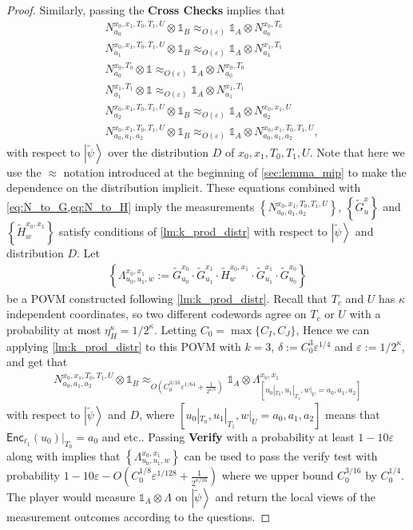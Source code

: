 \documentclass[10pt,a4paper]{article}
\theoremstyle{plain}
\theoremstyle{definition}
\newcommand {\set} [1] {\ensuremath{ \left\lbrace #1 \right\rbrace }}
\newcommand {\ket} [1] {\ensuremath{ \left| #1 \right\rangle }}
\newcommand {\id} {\ensuremath{\mathds{1}}}
\newcommand{\ep} {\ensuremath{\varepsilon}}
\newcommand{\x}{\otimes}
\newcommand{\appd}[1]{\approx_{#1}}
\newcommand{\1}{\mathbb{1}} %
\newcommand{\tG}{\tilde{G}}
\newcommand{\tH}{\tilde{H}}
\newcommand{\tpsi}{\tilde{\psi}}
\newcommand{\Enc}{\mathsf{Enc}}
\begin{document}
\begin{proof}
Similarly, passing the \textbf{Cross Checks} implies that
\begin{align}
	&N^{x_0, x_1, T_0, T_1, U}_{a_0} \x \id_B \appd{O(\ep)} \id_A \x N^{x_0, T_0}_{a_0} \\
	&N^{x_0, x_1, T_0, T_1, U}_{a_1} \x \id_B \appd{O(\ep)} \id_A \x N^{x_1, T_1}_{a_1} \\
	\label{eq:Nx0_consist}
	&N^{x_0, T_0}_{a_0} \x \id \appd{O(\ep)} \id_A \x N^{x_0, T_0}_{a_0} \\
	\label{eq:Nx1_consist}
	&N^{x_1, T_1}_{a_1} \x \id \appd{O(\ep)} \id_A \x N^{x_1, T_1}_{a_1} \\
	&N^{x_0, x_1, T_0, T_1, U}_{a_2} \x \id_B \appd{O(\ep)} \id_A \x N^{x_0, x_1, U}_{a_2} \\  
	&N^{x_0, x_1, T_0, T_1, U}_{a_0,a_1,a_2} \x \id_B \appd{O(\ep)} \id_A \x N^{x_0, x_1, T_0, T_1, U}_{a_0,a_1,a_2},
\end{align}
with respect to $\ket{\tpsi}$ over the distribution $D$ of $x_0, x_1, T_0, T_1, U$.
Note that here we use the $\approx$ notation introduced at the beginning of \cref{sec:lemma_mip}
to make the dependence on the distribution implicit.
These equations combined with \cref{eq:N_to_G,eq:N_to_H} imply the 
measurements $\set{ N^{x_0,x_1,T_0,T_1,U}_{a_0, a_1, a_2} }$, $\set{ \tG^x_u }$ and $\set{\tH^{x_0,x_1}_w}$ satisfy
conditions of \cref{lm:k_prod_distr} with respect to $\ket{\tpsi}$ and distribution $D$.
Let 
\begin{align*}
	\set{ \Lambda^{x_0,x_1}_{u_0,u_1,w} := \tG^{x_0}_{u_0} \cdot \tG^{x_1}_{u_1} \cdot \tH^{x_0,x_1}_{w} \cdot \tG^{x_1}_{u_1} \cdot 
	\tG^{x_0}_{u_0}}
\end{align*}
be a POVM constructed following \cref{lm:k_prod_distr}. 
Recall that $T_c$ and $U$ has $\kappa$ independent coordinates, so two different codewords agree on $T_c$ or $U$ with a probability at most 
$\eta_H^\kappa = 1/2^\kappa$.
Letting $C_0 = \max\{C_I, C_J\}$,
Hence we can applying \cref{lm:k_prod_distr} to this POVM with $k = 3$, $\delta := C_0^3\ep^{1/4} $ and $\ep:=1/2^{\kappa}$, and get that 
\begin{align}
	\label{eq:N_to_Lambda}
	N^{x_0, x_1, T_0, T_1, U}_{a_0,a_1,a_2} \x \id_B \appd{O(C_0^{3/16}\ep^{1/64} + \frac{1}{2^{\kappa/8}})} \id_A \x \Lambda^{x_0,x_1}_{[u_0|_{T_0}, u_1|_{T_1}, w|_U =
	a_0,a_1,a_2]} 
\end{align}
with respect to $\ket{\tpsi}$ and $D$, where $[u_0|_{T_0}, u_1|_{T_1}, w|_U =
	a_0,a_1,a_2]$ means that $\Enc_{\ell_1}(u_0)|_{T_0} = a_0$ and etc..
Passing \textbf{Verify} with a probability at least $1 - 10\ep$ along with 
 implies that $\set{\Lambda^{x_0,x_1}_{u_0,u_1,w} }$ can be used to pass the verify test with probability $1 - 10\ep - O(C_0^{1/8}\ep^{1/128} + \frac{1}{2^{\kappa/16}})$ where we upper bound $C_0^{3/16}$ by $C_0^{1/4}$. The player would measure $\id_A \x \Lambda$ on $\ket{\tpsi}$ and return the local views of the measurement outcomes according to the questions. 


\end{proof}
\end{document}
